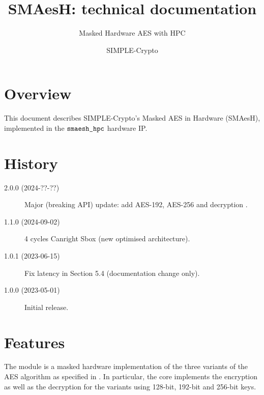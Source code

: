 \documentclass{scrartcl}
\title{SMAesH: technical documentation}
\subtitle{Masked Hardware AES with HPC}
\author{SIMPLE-Crypto}
\date{}
\begin{document}


\maketitle

\tableofcontents

\section{Overview}
\label{section:overview}
This document describes SIMPLE-Crypto's Masked AES in Hardware (SMAesH),
implemented in the $\texttt{smaesh\_hpc}$ hardware IP. 

\section{History}

\begin{description}
    \item[2.0.0 (2024-??-??)] Major (breaking API) update: add AES-192, AES-256 and decryption .
    \item[1.1.0 (2024-09-02)] 4 cycles Canright Sbox (new optimised architecture).
    \item[1.0.1 (2023-06-15)] Fix latency in Section 5.4 (documentation change only).
    \item[1.0.0 (2023-05-01)] Initial release.
\end{description}

\section{Features}
The \core{} module is a masked hardware implementation of the three variants of
the AES algorithm as specified in \cite{nist197}. In particular, the core
implements the encryption as well as the decryption for the variants using
128-bit, 192-bit and 256-bit keys.  
\end{document}
